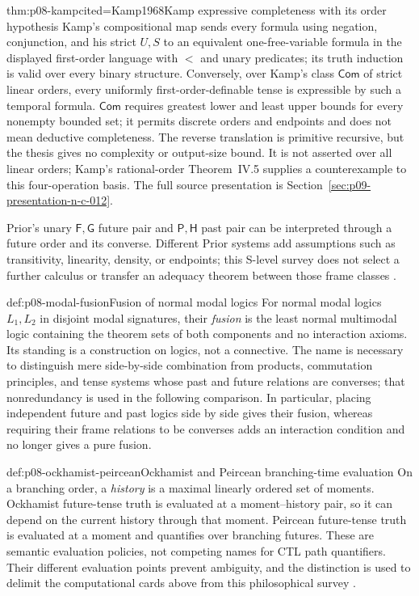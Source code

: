 \begin{hbtheorem}{thm:p08-kamp}{cited=Kamp1968}{Kamp expressive completeness with its order hypothesis}
Kamp's compositional map sends every formula using negation, conjunction, and
his strict \(U,S\) to an equivalent one-free-variable formula in the displayed
first-order language with \(<\) and unary predicates; its truth induction is
valid over every binary structure.  Conversely, over Kamp's class
\(\mathsf{Com}\) of strict linear orders, every uniformly
first-order-definable tense is expressible by such a temporal formula.
\(\mathsf{Com}\) requires greatest lower and least upper bounds for every
nonempty bounded set; it permits discrete orders and endpoints and does not
mean deductive completeness.  The reverse translation is primitive recursive,
but the thesis gives no complexity or output-size bound.  It is not asserted
over all linear orders; Kamp's rational-order Theorem~IV.5 supplies a
counterexample to this four-operation basis.  The full source presentation is
Section~\ref{sec:p09-presentation-n-c-012}.
\end{hbtheorem}

Prior's unary \(\mathsf F,\mathsf G\) future pair and
\(\mathsf P,\mathsf H\) past pair can be interpreted through a future order
and its converse.  Different Prior systems add assumptions such as
transitivity, linearity, density, or endpoints; this S-level survey does not
select a further calculus or transfer an adequacy theorem between those frame
classes \cite{Prior1967,Burgess1984}.

\begin{hbdefinition}{def:p08-modal-fusion}{Fusion of normal modal logics}
For normal modal logics \(L_1,L_2\) in disjoint modal signatures, their
\emph{fusion} is the least normal multimodal logic containing the theorem sets
of both components and no interaction axioms.  Its standing is a construction
on logics, not a connective.  The name is necessary to distinguish mere
 side-by-side combination from products, commutation principles, and tense
 systems whose past and future relations are converses; that nonredundancy is
 used in the following comparison.  In particular, placing independent future
 and past logics side by side gives their fusion, whereas requiring their frame
 relations to be converses adds an interaction condition and no longer gives a
 pure fusion.
\end{hbdefinition}

\begin{hbdefinition}{def:p08-ockhamist-peircean}{Ockhamist and Peircean branching-time evaluation}
On a branching order, a \emph{history} is a maximal linearly ordered set of
moments.  Ockhamist future-tense truth is evaluated at a moment--history pair,
so it can depend on the current history through that moment.  Peircean
future-tense truth is evaluated at a moment and quantifies over branching
futures.  These are semantic evaluation policies, not competing names for CTL
path quantifiers.  Their different evaluation points prevent ambiguity, and
the distinction is used to delimit the computational cards above from this
philosophical survey \cite{Burgess1984}.
\end{hbdefinition}

